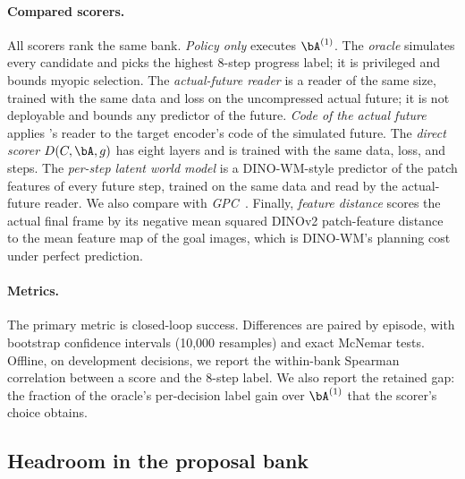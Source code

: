 \paragraph{Compared scorers.}
All scorers rank the same bank.
\emph{Policy only} executes $\bA^{(1)}$.
The \emph{oracle} simulates every candidate and picks the highest 8-step progress label; it is privileged and bounds myopic selection.
The \emph{actual-future reader} is a reader of the same size, trained with the same data and loss on the uncompressed actual future; it is not deployable and bounds any predictor of the future.
\emph{Code of the actual future} applies \method's reader to the target encoder's code of the simulated future.
The \emph{direct scorer} $D(C,\bA,g)$ has eight layers and is trained with the same data, loss, and steps.
The \emph{per-step latent world model} is a DINO-WM-style predictor of the patch features of every future step, trained on the same data and read by the actual-future reader.
We also compare with \emph{GPC}~\cite{qi2025gpc}.
Finally, \emph{feature distance} scores the actual final frame by its negative mean squared DINOv2 patch-feature distance to the mean feature map of the goal images, which is DINO-WM's planning cost under perfect prediction.

\paragraph{Metrics.}
The primary metric is closed-loop success.
Differences are paired by episode, with bootstrap confidence intervals (10{,}000 resamples) and exact McNemar tests.
Offline, on development decisions, we report the within-bank Spearman correlation between a score and the 8-step label.
We also report the retained gap: the fraction of the oracle's per-decision label gain over $\bA^{(1)}$ that the scorer's choice obtains.

\subsection{Headroom in the proposal bank}
\label{sec:headroom}

